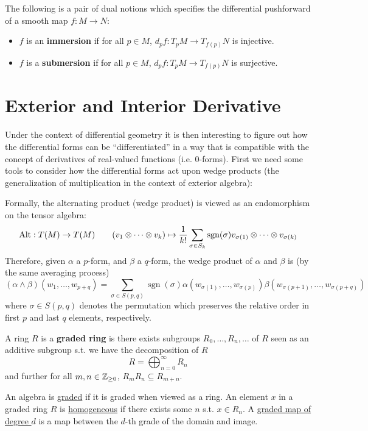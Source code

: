 \documentclass{article}
\begin{document}
\begin{definition}
    The following is a pair of dual notions which specifies the differential pushforward of a smooth map $f: M \to N$:
    \begin{itemize}
        \item $f$ is an \textbf{immersion} if for all $p \in M$, $d_p f : T_p  M \to T_{f          (p)} N$ is injective.
        \item $f$ is a \textbf{submersion} if for all $p \in M$, $d_p f : T_p  M \to T_{f(p)} N$ is surjective.
    \end{itemize}
\end{definition}

\section{Exterior and Interior Derivative}

\textstart
Under the context of differential geometry it is then interesting to figure out how the differential forms can be ``differentiated'' in a way that is compatible with the concept of derivatives of real-valued functions (i.e. $0$-forms). First we need some tools to consider how the differential forms act upon wedge products (the generalization of multiplication in the context of exterior algebra):

\begin{remark}\label{rmk: wedge of differential forms}
    Formally, the alternating product (wedge product) is viewed as an endomorphism on the tensor algebra:
    \[
        \operatorname{Alt}: T(M) \to T(M) \qquad (v_1 \otimes \cdots \otimes v_k) \mapsto \frac{1}{k!} \sum_{\sigma \in S_k} \operatorname{sgn}(\sigma) v_{\sigma(1)} \otimes \cdots \otimes v_{\sigma(k)}
    \]
    Therefore, given $\alpha$ a $p$-form, and $\beta$ a $q$-form, the wedge product of $\alpha$ and $\beta$ is (by the same averaging process)
    \[
        (\alpha\wedge\beta)(w_1, \dots, w_{p+q}) = \sum_{\sigma \in S(p, q)} \operatorname{sgn}(\sigma) \alpha(w_{\sigma(1)}, \dots, w_{\sigma(p)}) \beta(w_{\sigma(p+1)}, \dots, w_{\sigma(p+q)})
    \]
    where $\sigma \in S(p, q)$ denotes the permutation which preserves the relative order in first $p$ and last $q$ elements, respectively. 
\end{remark}

\begin{definition}
    A ring $R$ is a \textbf{graded ring} is there exists subgroups $R_0, \dots, R_n, \dots$ of $R$ seen as an additive subgroup s.t. we have the decomposition of $R$
    \[
        R = \bigoplus_{n = 0} ^ {\infty} R_n
    \]
    and further for all $m, n \in \mathbb{Z}_{\geq 0}$, $R_m R_n \subseteq R_{m + n}$. 

    An algebra is \underline{graded} if it is graded when viewed as a ring. An element $x$ in a graded ring $R$ is \underline{homogeneous} if there exists some $n$ s.t. $x \in R_n$. A \underline{graded map of degree $d$} is a map between the $d$-th grade of the domain and image. 
\end{definition}
\end{document}
